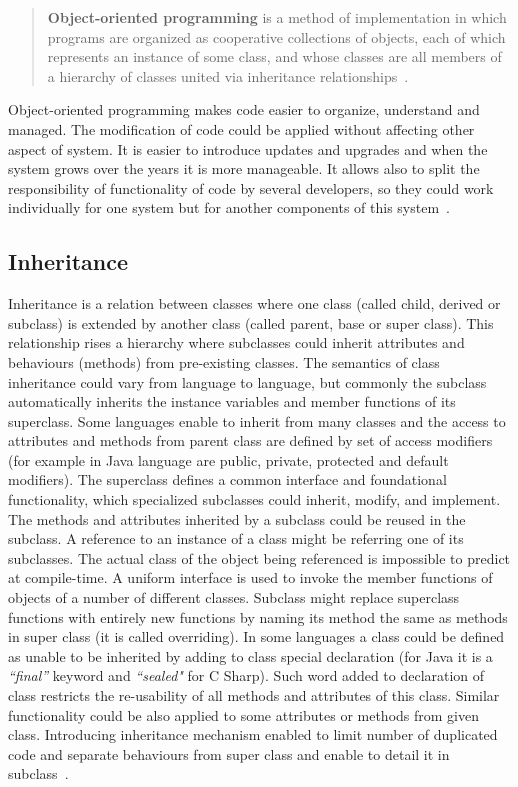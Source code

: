 \begin{quote}
\textbf{Object-oriented programming} is a method of implementation in which programs are organized as cooperative collections of objects, each of which represents an instance of some class, and whose classes are all members of a hierarchy of classes united via inheritance relationships~\cite{booch}.
\end{quote}

Object-oriented programming makes code easier to organize, understand and managed. The modification of code could be applied without affecting other aspect of system. It is easier to introduce updates and upgrades and when the system grows over the years it is more manageable. It allows also to split the responsibility of functionality of code by several developers, so they could work individually for one system but for another components of this system~\cite{booch}.  

\subsection*{Inheritance}
Inheritance is a relation between classes where one class (called child, derived or subclass)  is extended by another class (called parent, base  or super class). This relationship rises a hierarchy where subclasses could inherit attributes and behaviours (methods) from pre-existing classes. The semantics of class inheritance could vary from language to language, but commonly the subclass automatically inherits the instance variables and member functions of its superclass. Some languages enable to inherit from many classes and the access to attributes and methods from parent class are defined by set of access modifiers (for example in Java language are public, private, protected and default modifiers).  The superclass defines a common interface and foundational functionality, which specialized subclasses could inherit, modify, and implement. The methods and attributes inherited by a subclass could be reused in the subclass. A reference to an instance of a class might be referring one of its subclasses. The actual class of the object being referenced is impossible to predict at compile-time. A uniform interface is used to invoke the member functions of objects of a number of different classes. Subclass might replace superclass functions with entirely new functions by naming its method the same as methods in super class (it is called overriding).  In some languages a class could be defined as unable to be inherited by adding to class special declaration (for Java it is a \textit{``final''} keyword and \textit{``sealed"} for C Sharp). Such word added to declaration of class restricts the re-usability of all methods and attributes of this class. Similar functionality could be also applied to some attributes or methods  from given class. 
Introducing inheritance mechanism enabled to limit number of duplicated code and separate behaviours from super class and enable to detail it in subclass~\cite{SCJP}.


